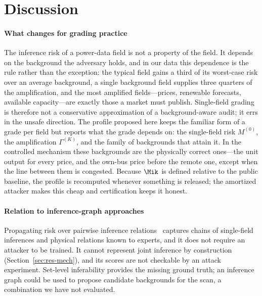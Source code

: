 \section{Discussion}\label{sec:discussion}

\paragraph{What changes for grading practice}
The inference risk of a power-data field is not a property of the field. It depends on the background
the adversary holds, and in our data this dependence is the rule rather than the exception: the
typical field gains a third of its worst-case risk over an average background, a single background
field supplies three quarters of the amplification, and the most amplified fields---prices, renewable
forecasts, available capacity---are exactly those a market must publish. Single-field grading is
therefore not a conservative approximation of a background-aware audit; it errs in the unsafe
direction. The profile proposed here keeps the familiar form of a grade per field but reports what the
grade depends on: the single-field risk $M^{(0)}$, the amplification $\Gamma^{(K)}$, and the family of
backgrounds that attain it. In the controlled mechanism these backgrounds are the physically correct
ones---the unit output for every price, and the own-bus price before the remote one, except when the
line between them is congested. Because $\Mik$ is defined relative to the public baseline, the profile
is recomputed whenever something is released; the amortized attacker makes this cheap and
certification keeps it honest.

\paragraph{Relation to inference-graph approaches}
Propagating risk over pairwise inference relations~\cite{hu2026ignn} captures chains of
single-field inferences and physical relations known to experts, and it does not require an
attacker to be trained. It cannot represent joint inference by construction (Section~\ref{sec:res-mech}),
and its scores are not checkable by an attack experiment. Set-level inferability provides the
missing ground truth; an inference graph could be used to propose candidate backgrounds for the
scan, a combination we have not evaluated.

